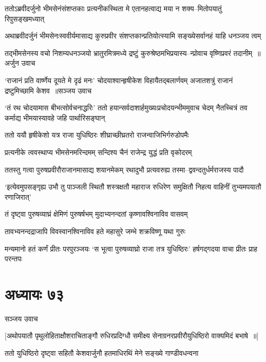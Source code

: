 \twolineshloka
{ततोऽब्रवीदर्जुनो भीमसेनंसंशप्तकाः प्रत्यनीकस्थिता मे}
{एतानहत्वाद्य मया न शक्य--मितोपयातुं रिपुसङ्खमध्यात्}


\twolineshloka
{अथाब्रवीदर्जुनं भीमसेनःस्ववीर्यमासाद्य कुरुप्रवीर}
{संशप्तकान्प्रतियोत्स्यामि सङ्ख्येसर्वानहं याहि धनञ्जय त्वम्}


\threelineshloka
{तद्भीमसेनस्य वचो निशम्यधनञ्जयो भ्रातुरमित्रमध्ये}
{द्रष्टुं कुरुश्रेष्ठमभिप्रयास्य--न्प्रोवाच वृष्णिप्रवरं तदानीम् ॥अर्जुन उवाच}
{}


\fourlineindentedshloka
{`राजानं प्रति वार्ष्णेय दूयते मे दृढं मनः'}
{चोदयाश्वान्हृषीकेश विहायैतद्बलार्णवम्}
{अजातशत्रुं राजानं द्रष्टुमिच्छामि केशव ॥सञ्जय उवाच}
{}


`तं रथ चोदयामास बीभत्सोर्वचनाद्धरिः'
\twolineshloka
{ततो हयान्सर्वदाशार्हमुख्यःप्रचोदयन्भीममुवाच चेदम्}
{नैतच्चित्रं तव कर्माद्य भीमयास्यावहे जहि पार्थारिसङ्घान्}


\twolineshloka
{ततो ययौ हृषीकेशो यत्र राजा युधिष्ठिरः}
{शीघ्राच्छीघ्रतरो राजन्वाजिभिर्गरुडोपमैः}


\twolineshloka
{प्रत्यनीके त्ववस्थाप्य भीमसेनमरिन्दमम्}
{सन्दिश्य चैनं राजेन्द्र युद्धं प्रति वृकोदरम्}


\twolineshloka
{ततस्तु गत्वा पुरुषप्रवीरौराजानमासाद्य शयानमेकम्}
{रथादुभौ प्रत्यवरुह्य तस्मा--द्ववन्दतुर्धर्मराजस्य पादौ}


\threelineshloka
{`इत्येवमुपसङ्गृह्य उभौ तु पाञ्जली स्थितौ}
{शस्त्रक्षतौ महाराज रुधिरेण समुक्षितौ}
{निहत्य वाहिनीं तुभ्यमपयातौ रणाजिरात्'}


\twolineshloka
{तं दृष्ट्वा पुरुषव्याघ्रं क्षेमिणं पुरुषर्षभम्}
{मुदाभ्यनन्दतां कृष्णावश्विनाविव वासवम्}


\twolineshloka
{तावभ्यनन्दद्राजापि विवस्वानश्विनाविव}
{हते महासुरे जम्भे शक्रविष्णू यथा गुरुः}


\threelineshloka
{मन्यमानो हतं कर्णं प्रीतः परपुरञ्जयः}
{`स भूत्वा पुरुषव्याघ्रो राजा तत्र युधिष्ठिरः'}
{हर्षगद्गदया वाचा प्रीतः प्राह परन्तपः}


\chapter{अध्यायः ७३}
\twolineshloka
{सञ्जय उवाच}
{}


\twolineshloka
{[अथोपयातौ पृथुलोहिताक्षौशराचिताङ्गौ रुधिरप्रदिग्धौ}
{समीक्ष्य सेनाग्रनरप्रवीरौयुधिष्ठिरो वाक्यमिदं बभाषे ॥]}


\twolineshloka
{ततो युधिष्ठिरो दृष्ट्वा सहितौ केशवार्जुनौ}
{हतमाधिरथिं मेने सङ्ख्ये गाण्डीवधन्वना}


